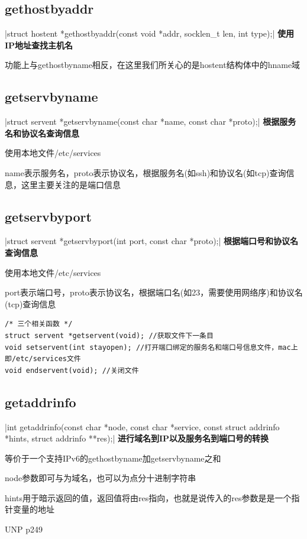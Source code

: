 \subsection{gethostbyaddr}
|struct hostent *gethostbyaddr(const void *addr, socklen_t len, int type);|
\noindent \textbf{使用IP地址查找主机名}
\begin{spacing}{2.0}
功能上与gethostbyname相反，在这里我们所关心的是hostent结构体中的h\li name域
\end{spacing}
\newpage

\subsection{getservbyname}
|struct servent *getservbyname(const char *name, const char *proto);|
\noindent \textbf{根据服务名和协议名查询信息}
\begin{spacing}{2.0}
使用本地文件/etc/services

name表示服务名，proto表示协议名，根据服务名(如ssh)和协议名(如tcp)查询信息，这里主要关注的是端口信息
\end{spacing}
\newpage

\subsection{getservbyport}
|struct servent *getservbyport(int port, const char *proto);|
\noindent \textbf{根据端口号和协议名查询信息}
\begin{spacing}{2.0}
使用本地文件/etc/services

port表示端口号，proto表示协议名，根据端口名(如23，需要使用网络序)和协议名(tcp)查询信息

\begin{verbatim}
/* 三个相关函数 */
struct servent *getservent(void); //获取文件下一条目
void setservent(int stayopen); //打开端口绑定的服务名和端口号信息文件，mac上即/etc/services文件
void endservent(void); //关闭文件
\end{verbatim}
\end{spacing}
\newpage

\subsection{getaddrinfo}
|int getaddrinfo(const char *node, const char *service, const struct addrinfo *hints, struct addrinfo **res);|
\noindent \textbf{进行域名到IP以及服务名到端口号的转换}
\begin{spacing}{2.0}
等价于一个支持IPv6的gethostbyname加getservbyname之和

node参数即可与为域名，也可以为点分十进制字符串

hints用于暗示返回的值，返回值将由res指向，也就是说传入的res参数是是一个指针变量的地址

UNP p249
\end{spacing}

